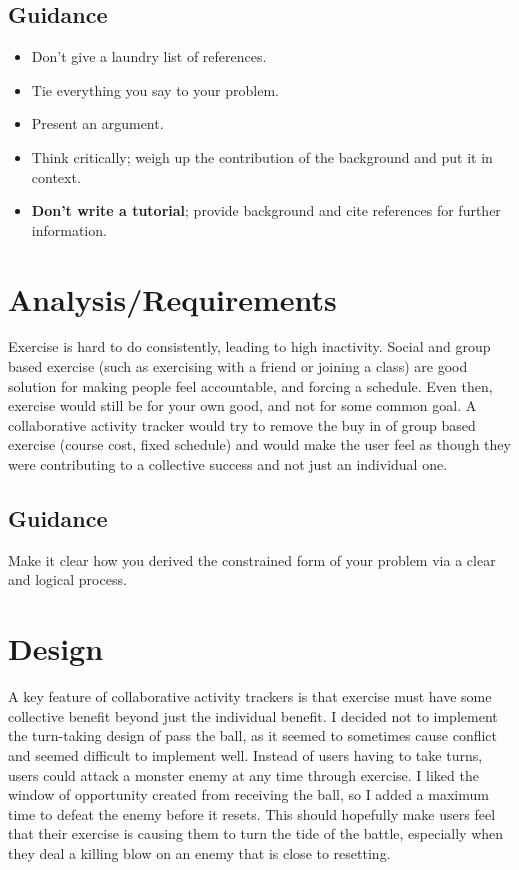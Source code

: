 \documentclass{l4proj}
\begin{document}
\section{Guidance}
\begin{itemize}    
    \item
      Don't give a laundry list of references.
    \item
      Tie everything you say to your problem.
    \item
      Present an argument.
    \item Think critically; weigh up the contribution of the background and put it in context.    
    \item
      \textbf{Don't write a tutorial}; provide background and cite
      references for further information.
\end{itemize}

\chapter{Analysis/Requirements}
Exercise is hard to do consistently, leading to high inactivity. Social and group based exercise (such as exercising with a friend or joining a class) are good solution for making people feel accountable, and forcing a schedule. Even then, exercise would still be for your own good, and not for some common goal. A collaborative activity tracker would try to remove the buy in of group based exercise (course cost, fixed schedule) and would make the user feel as though they were contributing to a collective success and not just an individual one. 
\section{Guidance}
Make it clear how you derived the constrained form of your problem via a clear and logical process. 

\chapter{Design}

A key feature of collaborative activity trackers is that exercise must have some collective benefit beyond just the individual benefit. I decided not to implement the turn-taking design of pass the ball, as it seemed to sometimes cause conflict and seemed difficult to implement well. Instead of users having to take turns, users could attack a monster enemy at any time through exercise. I liked the window of opportunity created from receiving the ball, so I added a maximum time to defeat the enemy before it resets. This should hopefully make users feel that their exercise is causing them to turn the tide of the battle, especially when they deal a killing blow on an enemy that is close to resetting.
\end{document}
